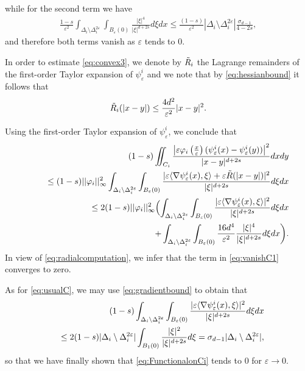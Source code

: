 \documentclass[11pt,a4paper,reqno]{amsart}
\theoremstyle{plain}
\theoremstyle{definition}
\newcommand\e{\varepsilon}
\newcommand\be{\begin{equation}}
\newcommand\ee{\end{equation}}
\newcommand\Omid{\Delta_i^{2\varepsilon}}
\theoremstyle{remark}
\begin{document}
while for the second term we have 
\begin{eqnarray}\label{eq:radialcomputation}
     \frac{1-s}{\e^2}\int_{\Delta_i\setminus{\Omid}}\int_{B_{\e}(0)}\frac{\lvert\xi\rvert^4 }{\lvert \xi\rvert^{d+2s}}d\xi dx
     \leq   \frac{(1-s)}{\e^2}|\Delta_i\setminus\Omid|\frac{\sigma_{d-1}}{4-2s},
\end{eqnarray}
and therefore both terms vanish as $\e$ tends to $0$.

In order to estimate \eqref{eq:convex3}, we denote by $\Tilde{R}_i$ the Lagrange remainders of the first-order Taylor expansion of $\psi_\e^i$ and we note that by \eqref{eq:hessianbound} it follows that
\be
\Tilde{R}_i(|x-y|)\leq \frac{4d^2}{\e^2}|x-y|^2.
\ee

\noindent
Using the first-order Taylor expansion of $\psi^i_\e$, we conclude that
\begin{eqnarray}\nonumber&& \hspace{-2.5 cm}
    (1-s)\iint_{C_i}\frac{\left\lvert\e\varphi_i\left(\frac{x}{\e}\right)(\psi^i_\e(x)-\psi^i_\e(y))\right\rvert^2}{\lvert x-y\rvert^{d+2s}}dxdy\\\nonumber &&
    \leq(1-s)\lvert\lvert\varphi_i\rvert\rvert_\infty^2 \int_{\Delta_i\setminus{\Omid}}\int_{B_{\e}(0)}\frac{\lvert\e\langle\nabla{\psi^i_\e(x)},\xi\rangle+\e \Tilde{R}(|x-y|)\rvert^2}{\lvert\xi\rvert^{d+2s}}d\xi dx\\ \label{eq:usualC} &&
    \leq 2 (1-s)\lvert\lvert\varphi_i\rvert\rvert_\infty^2\Bigl(\int_{\Delta_i\setminus{\Omid}}\int_{B_{\e}(0)}\frac{\lvert\e\langle\nabla{\psi^i_\e(x)},\xi\rangle\rvert^2}{\lvert\xi\rvert^{d+2s}}d\xi dx\\ \label{eq:vanishC1} &&
    \qquad \qquad  \qquad \qquad \qquad  \qquad \qquad + \int_{\Delta_i\setminus{\Omid}}\int_{B_{\e}(0)}\frac{16d^4}{\e^2}\frac{\lvert\xi\rvert^4}{\lvert\xi\rvert^{d+2s}}d\xi dx\biggr).
\end{eqnarray}
In view of \eqref{eq:radialcomputation}, we infer that the term in  \eqref{eq:vanishC1} converges to zero. 

As for \eqref{eq:usualC}, we may use  \eqref{eq:gradientbound} to obtain that
\begin{eqnarray*}&&\nonumber
\hspace{-1 cm}(1-s)\int_{\Delta_i\setminus{\Omid}}\int_{B_{\e}(0)}\frac{\lvert\e\langle\nabla{\psi^i_\e(x)},\xi\rangle\rvert^2}{\lvert\xi\rvert^{d+2s}}d\xi dx\\
&&  \leq 2 (1-s)|\Delta_i\setminus{\Omid}|\int_{B_1(0)}\frac{|\xi|^2}{|\xi|^{d+2s}}d\xi = \sigma_{d-1}|\Delta_i\setminus{\Omid}|,
\end{eqnarray*}
so that we have finally shown that \eqref{eq:FunctionalonCi} tends to $0$ for $\e \to 0$.
\end{document}
